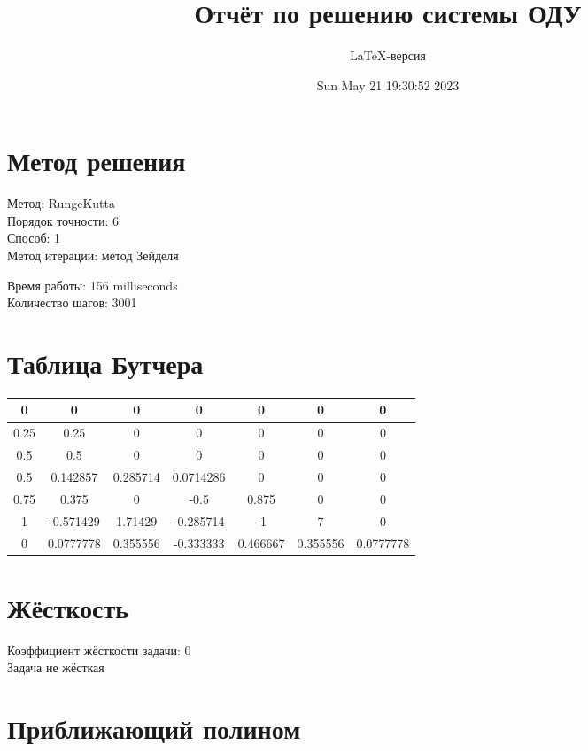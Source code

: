 \documentclass[a4paper,14pt]{extarticle}
\title{Отчёт по решению системы ОДУ}
\author{LaTeX-версия}
\date{Sun May 21 19:30:52 2023}
\begin{document}
\maketitle

\tableofcontents
\pagebreak

\section{Метод решения}

Метод: RungeKutta\\
Порядок точности: 6\\
Способ: 1\\
Метод итерации: метод Зейделя

Время работы: 156 milliseconds\\
Количество шагов: 3001\\
\section{Таблица Бутчера}

\begin{table}[h]
\centering
\begin{tabular}{|c||c|c|c|c|c|c|}
\hline
0 & 0 & 0 & 0 & 0 & 0 & 0\\
\hline
0.25 & 0.25 & 0 & 0 & 0 & 0 & 0\\
\hline
0.5 & 0.5 & 0 & 0 & 0 & 0 & 0\\
\hline
0.5 & 0.142857 & 0.285714 & 0.0714286 & 0 & 0 & 0\\
\hline
0.75 & 0.375 & 0 & -0.5 & 0.875 & 0 & 0\\
\hline
1 & -0.571429 & 1.71429 & -0.285714 & -1 & 7 & 0\\
\hline
0 & \cellcolor{lightgray} 0.0777778 & \cellcolor{lightgray} 0.355556 & \cellcolor{lightgray} -0.333333 & \cellcolor{lightgray} 0.466667 & \cellcolor{lightgray} 0.355556 & \cellcolor{lightgray} 0.0777778\\
\hline
\end{tabular}
\end{table}

\section{Жёсткость}

Коэффициент жёсткости задачи: 0\\
Задача не жёсткая

\section{Приближающий полином}
\end{document}
